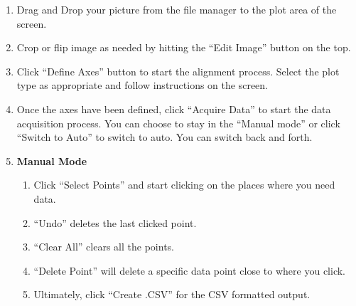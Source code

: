 \documentclass[letterpaper, 11pt]{article}
\begin{document}
\begin{enumerate}
\item{Drag and Drop your picture from the file manager to the plot area of the screen.}
\item{Crop or flip image as needed by hitting the ``Edit Image'' button on the top.}
\item{Click ``Define Axes'' button to start the alignment process. Select the plot type as appropriate and follow instructions on the screen.}
\item{Once the axes have been defined, click ``Acquire Data'' to start the data acquisition process. You can choose to stay in the ``Manual mode'' or click ``Switch to Auto'' to switch to auto. You can switch back and forth.}
\item{{\bf Manual Mode}
\begin{enumerate}
\item{Click ``Select Points'' and start clicking on the places where you need data.}
\item{``Undo'' deletes the last clicked point.}
\item{``Clear All'' clears all the points.}
\item{``Delete Point'' will delete a specific data point close to where you click.}
\item{Ultimately, click ``Create .CSV'' for the CSV formatted output.}
\end{enumerate}
}


\end{enumerate}
\end{document}
